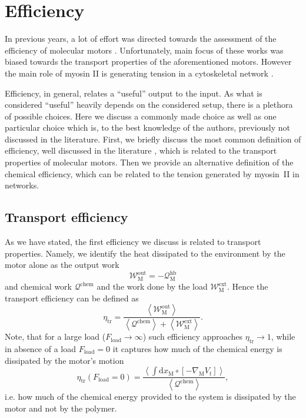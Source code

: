 \documentclass[aps,pre,twocolumn,showpacs,showkeys,superscriptaddress,floatfix]{revtex4-1}
\newcommand{\rmd}{{\mathrm d}}
\begin{document}
\section{Efficiency} 
\label{sec:efficiency}
In previous years, a lot of effort was directed towards the assessment of the efficiency of molecular motors \cite{Schmiedl2008,boksenbojm2009entropy,parmeggiani1999energy,parrondo1998efficiency,zhang2009efficiency}. 
Unfortunately, main focus of these works was biased towards the transport properties of the aforementioned motors. 
However the main role of myosin II is generating tension in a cytoskeletal network \cite{ma2012nonmuscle,chugh2017actin,monier2010actomyosin}.

Efficiency, in general, relates a ``useful'' output to the input.
As what is considered ``useful'' heavily depends on the considered setup, there is a plethora of possible choices.
Here we discuss a commonly made choice as well as one particular choice which is, to the best knowledge of the authors, previously not discussed in the literature. 
First, we briefly discuss the most common definition of efficiency, well discussed in the literature \cite{Schmiedl2008,boksenbojm2009entropy,parmeggiani1999energy,zhang2009efficiency}, which is related to the transport properties of molecular motors. 
Then we provide an alternative definition of the chemical efficiency, which can be related to the tension generated by myosin~II in networks. 

\subsection{Transport efficiency} 
As we have stated, the first efficiency we discuss is related to transport properties. 
Namely, we identify the heat dissipated to the environment by the motor alone as the output work 
\[
{\mathcal W}^\text{out}_\text{M} = - {\mathcal Q}^\text{hb}_\text{M} 
\] 
and chemical work $\mathcal Q^\text{chem}$ and the work done by the load $\mathcal W^\text{ext}_\text{M}$.
Hence the transport efficiency can be defined as 
\[
\eta_\text{tr} = \frac{ \left\langle {\mathcal W}^\text{out}_\text{M} \right\rangle }{ \left\langle {\mathcal Q}^\text{chem} \right\rangle + \left\langle {\mathcal W}^\text{ext}_\text{M} \right\rangle } .
\]
Note, that for a large load ($F_\text{load} \to \infty$) such efficiency approaches $\eta_\text{tr} \to 1$, 
while in absence of a load $F_\text{load} = 0$ it captures how much of the chemical energy is dissipated by the motor's motion  
\[
\eta_\text{tr}( F_\text{load} = 0 ) = \frac{ \left\langle \int \rmd x_\text{M} \circ \left[ - \nabla_\text{M} V_t \right] \right\rangle }{ \left\langle {\mathcal Q}^\text{chem} \right\rangle } ,
\]
i.e. how much of the chemical energy provided to the system is dissipated by the motor and not by the polymer. 
\end{document}

